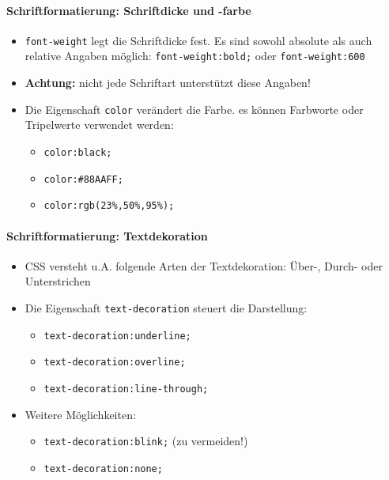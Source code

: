 \paragraph{Schriftformatierung: Schriftdicke und -farbe}
\begin{itemize}[noitemsep,topsep=0pt,leftmargin=*]
    \item \texttt{font-weight} legt die Schriftdicke fest. Es sind sowohl absolute als auch relative Angaben möglich: \texttt{font-weight:bold;} oder \texttt{font-weight:600}
    \item \textbf{Achtung:} nicht jede Schriftart unterstützt diese Angaben!
    \item Die Eigenschaft \texttt{color} verändert die Farbe. es können Farbworte oder Tripelwerte verwendet werden:
    \begin{itemize}[noitemsep,topsep=0pt,leftmargin=*]
        \item \texttt{color:black;}
        \item \texttt{color:\#88AAFF;}
        \item \texttt{color:rgb(23\%,50\%,95\%);}
    \end{itemize}
\end{itemize}

\paragraph{Schriftformatierung: Textdekoration}
\begin{itemize}[noitemsep,topsep=0pt,leftmargin=*]
    \item CSS versteht u.A. folgende Arten der Textdekoration: Über-, Durch- oder Unterstrichen
    \item Die Eigenschaft \texttt{text-decoration} steuert die Darstellung:
    \begin{itemize}[noitemsep,topsep=0pt,leftmargin=*]
        \item \texttt{text-decoration:underline;}
        \item \texttt{text-decoration:overline;}
        \item \texttt{text-decoration:line-through;}
    \end{itemize}
    \item Weitere Möglichkeiten:
    \begin{itemize}[noitemsep,topsep=0pt,leftmargin=*]
        \item \texttt{text-decoration:blink;} (zu vermeiden!)
        \item \texttt{text-decoration:none;}
    \end{itemize}
\end{itemize}

